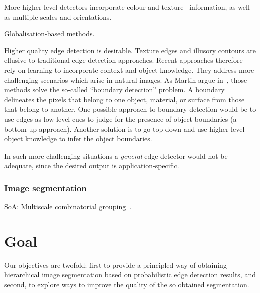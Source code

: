 More higher-level detectors incorporate colour and texture~\cite{rubner1996coalescing,will2000learning} information, as well as multiple scales and orientations.

Globalisation-based methods.

Higher quality edge detection is desirable. Texture edges and illusory contours are ellusive to %
traditional edge-detection approaches. Recent approaches therefore rely on learning to incorporate context and object knowledge. They address more challenging scenarios which arise in natural images. As Martin \etal argue in~\cite{martin2004learning}, those methods solve the so-called ``boundary detection'' problem. A boundary delineates the pixels that belong to one object, material, or surface from those that belong to another. One possible approach to boundary detection would be to use edges as low-level cues to judge for the presence of object boundaries (a bottom-up approach). Another solution is to go top-down and use higher-level object knowledge to infer the object boundaries.

In such more challenging situations a \textit{general} edge detector would not be adequate, since the desired output is application-specific.


\subsubsection{Image segmentation}

SoA: Multiscale combinatorial grouping~\cite{Arbelaez2014multiscale}.

\section{Goal}
Our objectives are  twofold:  first to provide a principled way of obtaining hierarchical image segmentation based on probabilistic edge detection results, and second, to explore ways to improve the quality of the so %
obtained segmentation.




